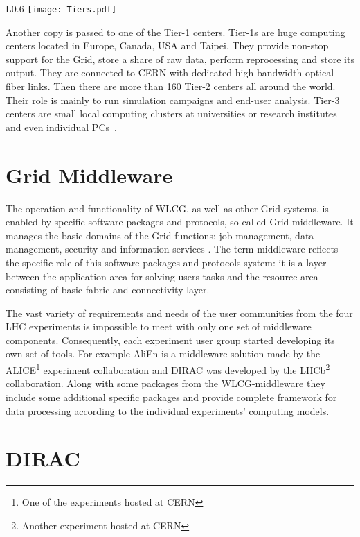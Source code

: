 \begin{wrapfigure}{L}{0.6\textwidth}
\centering
\texttt{[image: Tiers.pdf]}
\caption{The WLCG Tier-1 centers with CERN Tier-0 in the middle}
\label{fig:WLCG}
\end{wrapfigure}

Another copy is passed to one of the Tier-1 centers. Tier-1s are huge computing centers located in Europe, Canada, USA 
and Taipei. They provide non-stop support for the Grid, store a share of raw data, perform reprocessing and store 
its output. They are connected to CERN with dedicated high-bandwidth optical-fiber links. Then there are more than 
160 Tier-2 centers all around the world. Their role is mainly to run simulation campaigns and end-user analysis. 
Tier-3 centers are small local computing clusters at universities or research institutes and even individual 
PCs~\cite{TGrid}.

\section*{Grid Middleware}

The operation and functionality of WLCG, as well as other Grid systems, is enabled by specific software packages 
and protocols, so-called Grid middleware. It manages the basic domains of the Grid functions: job management, 
data management, security and information services \cite{GriCom}. The term middleware reflects the specific role 
of this software packages and protocols system: it is a layer between the application area for solving users tasks 
and the resource area consisting of basic fabric and connectivity layer. 

The vast variety of requirements and needs of the user communities from the four LHC experiments is impossible to 
meet with only one set of middleware components. Consequently, each experiment user group started developing its 
own set of tools. For example AliEn is a middleware solution made by the 
ALICE\footnote{One of the experiments hosted at CERN} experiment collaboration and DIRAC was developed by the 
LHCb\footnote{Another experiment hosted at CERN} collaboration. Along with some packages from the WLCG-middleware 
they include some additional specific packages and provide complete framework for data processing according to the 
individual experiments' computing models.

\section*{DIRAC}

